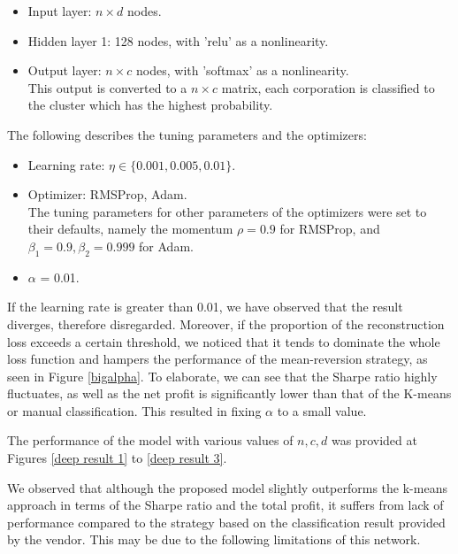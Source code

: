 \documentclass[11pt]{article}
\begin{document}
\begin{itemize}
    \item Input layer: $n \times d$ nodes.
    \item Hidden layer 1: 128 nodes, with 'relu' as a nonlinearity.
    \item Output layer: $n \times c$ nodes, with 'softmax' as a nonlinearity. \\
    This output is converted to a $n \times c$ matrix, each corporation is classified to the cluster which has the highest probability.
\end{itemize}

The following describes the tuning parameters and the optimizers:

\begin{itemize}
    \item Learning rate: $\eta \in \{ 0.001, 0.005, 0.01 \}.$
    \item Optimizer: RMSProp, Adam. \\
    The tuning parameters for other parameters of the optimizers were set to their defaults, namely the momentum $\rho = 0.9$ for RMSProp, and $\beta_1 = 0.9, \beta_2 = 0.999$ for Adam.
    \item $\alpha$ = 0.01.
\end{itemize}

If the learning rate is greater than 0.01, we have observed that the result diverges, therefore disregarded. Moreover, if the proportion of the reconstruction loss exceeds a certain threshold, we noticed that it tends to dominate the whole loss function and hampers the performance of the mean-reversion strategy, as seen in Figure \ref{bigalpha}. To elaborate, we can see that the Sharpe ratio highly fluctuates, as well as the net profit is significantly lower than that of the K-means or manual classification. This resulted in fixing $\alpha$ to a small value.

The performance of the model with various values of $n, c, d$ was provided at Figures \ref{deep result 1} to \ref{deep result 3}.

We observed that although the proposed model slightly outperforms the k-means approach in terms of the Sharpe ratio and the total profit, it suffers from lack of performance compared to the strategy based on the classification result provided by the vendor. This may be due to the following limitations of this network.
\end{document}
